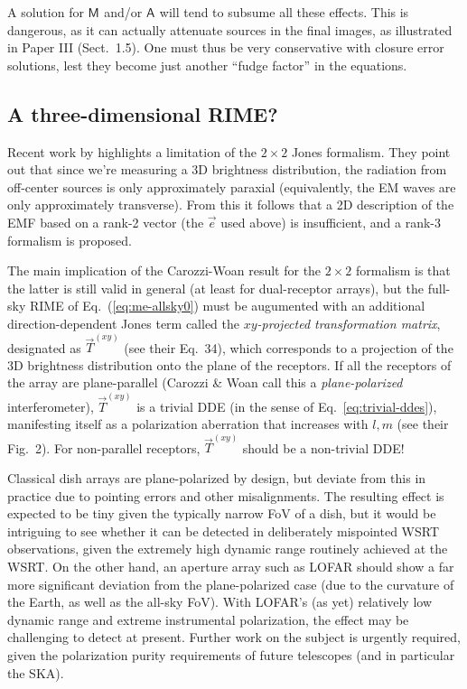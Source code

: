 \documentclass[referee]{aa}
\newcommand{\jones}[2]{\vec {#1}_{#2}}
\newcommand{\coh}[2]{\mathsf{{#1}}_{{#2}}}
\begin{document}
A solution for $\coh{M}{}$ and/or $\coh{A}{}$ will tend to subsume all these effects. This is dangerous, as it can actually attenuate sources in the final images, as illustrated in Paper III (Sect.~1.5). One must thus be very conservative with closure error solutions, lest they become just another ``fudge factor'' in the equations.

\subsection{A three-dimensional RIME?\label{sec:3D-rime}}

Recent work by \citet{Carozzi:ME3D} highlights a limitation of the $2\times2$ Jones formalism. They point out that 
since we're measuring a 3D brightness distribution, the radiation from off-center sources is only approximately paraxial (equivalently, the EM waves are only approximately transverse). From this it follows that a 2D description of the EMF 
based on a rank-2  vector (the $\vec e$ used above) is insufficient, and a rank-3 formalism is proposed. 

The main implication of the Carozzi-Woan result for the $2\times2$ formalism is that the latter is still valid in general (at least for dual-receptor arrays), but the full-sky RIME of Eq.~(\ref{eq:me-allsky0}) must be augumented with an additional direction-dependent Jones term called the \emph{$xy$-projected transformation matrix}, designated as $\jones{T}{}^{(xy)}$ (see their Eq.~34), which corresponds to a projection of the 3D brightness distribution onto the plane of the receptors. If all the receptors of the array are plane-parallel (Carozzi \& Woan call this a {\em plane-polarized} interferometer), $\jones{T}{}^{(xy)}$ is a trivial DDE (in the sense of Eq.~\ref{eq:trivial-ddes}), manifesting itself as a polarization aberration that increases with $l,m$ (see their Fig.~2). For non-parallel receptors, $\jones{T}{}^{(xy)}$ should be a non-trivial DDE!

Classical dish arrays are plane-polarized by design, but deviate from this in practice due to pointing errors and other misalignments. The resulting effect is expected to be tiny given the typically narrow FoV of a dish, but it would be intriguing to see whether it can be detected in deliberately mispointed WSRT observations, given the extremely high dynamic range routinely achieved at the WSRT. On the other hand, an aperture array such as LOFAR should show a far more significant deviation from the plane-polarized case (due to the curvature of the Earth, as well as the all-sky FoV). With LOFAR's (as yet) relatively low dynamic range and extreme instrumental polarization, the effect may be challenging to detect at present. Further work on the subject is urgently required, given the polarization purity requirements of future telescopes (and in particular the SKA).
\end{document}
